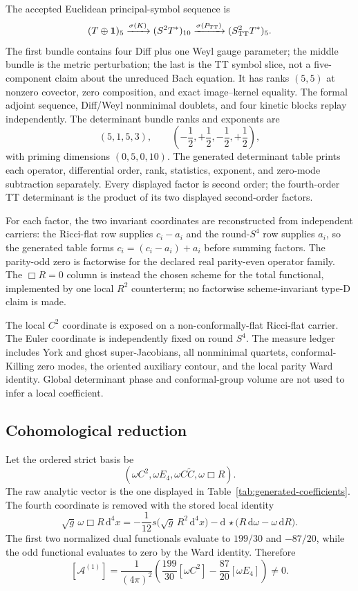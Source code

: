 \documentclass[11pt]{article}
\theoremstyle{definition}
\theoremstyle{remark}
\newcommand{\cA}{\mathcal A}
\newcommand{\dd}{\mathrm d}
\begin{document}
The accepted Euclidean principal-symbol sequence is
\[
 (T\oplus\mathbf1)_5\xrightarrow{\sigma(K)}(S^2T^*)_{10}
 \xrightarrow{\sigma(P_{\rm TT})}(S^2_{\rm TT}T^*)_5.
\]
The first bundle contains four Diff plus one Weyl gauge parameter; the middle
bundle is the metric perturbation; the last is the TT symbol slice, not a
five-component claim about the unreduced Bach equation.  It has ranks $(5,5)$
at nonzero covector, zero composition, and exact image--kernel equality.  The
formal adjoint sequence, Diff/Weyl nonminimal
doublets, and four kinetic blocks replay independently.  The determinant
bundle ranks and exponents are
\[
 (5,1,5,3),\qquad
 \left(-\frac12,+\frac12,-\frac12,+\frac12\right),
\]
with priming dimensions $(0,5,0,10)$.
The generated determinant table prints each operator, differential order,
rank, statistics, exponent, and zero-mode subtraction separately.  Every
displayed factor is second order; the fourth-order TT determinant is the
product of its two displayed second-order factors.

For each factor, the two invariant coordinates are reconstructed from
independent carriers: the Ricci-flat row supplies $c_i-a_i$ and the
round-$S^4$ row supplies $a_i$, so the generated table forms
$c_i=(c_i-a_i)+a_i$ before summing factors.  The parity-odd zero is factorwise
for the declared real parity-even operator family.  The $\Box R=0$ column is
instead the chosen scheme for the total functional, implemented by one local
$R^2$ counterterm; no factorwise scheme-invariant type-D claim is made.

The local $C^2$ coordinate is exposed on a non-conformally-flat Ricci-flat
carrier.  The Euler coordinate is independently fixed on round $S^4$.  The
measure ledger includes York and ghost super-Jacobians, all nonminimal
quartets, conformal-Killing zero modes, the oriented auxiliary contour, and
the local parity Ward identity.  Global determinant phase and conformal-group
volume are not used to infer a local coefficient.

\subsection{Cohomological reduction}

Let the ordered strict basis be
\[
 (\omega C^2,\omega E_4,\omega C\widetilde C,\omega\Box R).
\]
The raw analytic vector is the one displayed in
Table~\ref{tab:generated-coefficients}.  The fourth coordinate is removed with
the stored local identity
\[
 \sqrt g\,\omega\Box R\,\dd^4x
 =-\frac1{12}s\bigl(\sqrt g\,R^2\,\dd^4x\bigr)
  -\dd\,\star\bigl(R\,\dd\omega-\omega\,\dd R\bigr).
\]
The first two normalized dual
functionals evaluate to $199/30$ and $-87/20$, while the odd functional
evaluates to zero by the Ward identity.  Therefore
\[
 [\cA^{(1)}]
 =\frac{1}{(4\pi)^2}
 \left(\frac{199}{30}[\omega C^2]
       -\frac{87}{20}[\omega E_4]\right)\neq0.
\]
\end{document}
